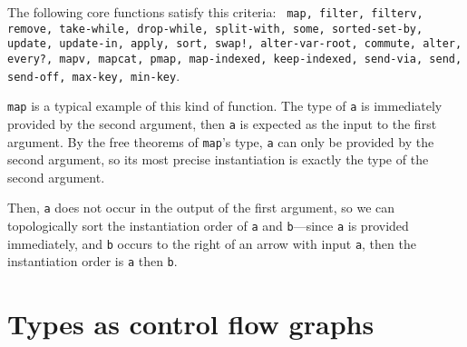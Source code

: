 \documentclass[9pt]{extarticle}
\begin{document}
The following core functions satisfy this criteria: \texttt{
map, filter, filterv, remove, take-while, drop-while, split-with, some, sorted-set-by,
update, update-in, apply, sort, swap!, alter-var-root, commute, alter, every?, mapv,
mapcat, pmap, map-indexed, keep-indexed, send-via, send, send-off, max-key, min-key}.

\texttt{map} is a typical example of this kind of function. The type of \texttt{a} is immediately
provided by the second argument, then \texttt{a} is expected as the input to the first argument.
By the free theorems of \texttt{map}'s type, \texttt{a} can only be provided by the second argument, so
its most precise instantiation is exactly the type of the second argument.

%

Then, \texttt{a} does not occur in the output of the first argument, so we can topologically sort
the instantiation order of \texttt{a} and \texttt{b}---since \texttt{a} is provided immediately, and
\texttt{b} occurs to the right of an arrow with input \texttt{a}, then the instantiation
order is \texttt{a} then \texttt{b}.

\section{Types as control flow graphs}

%
\end{document}
